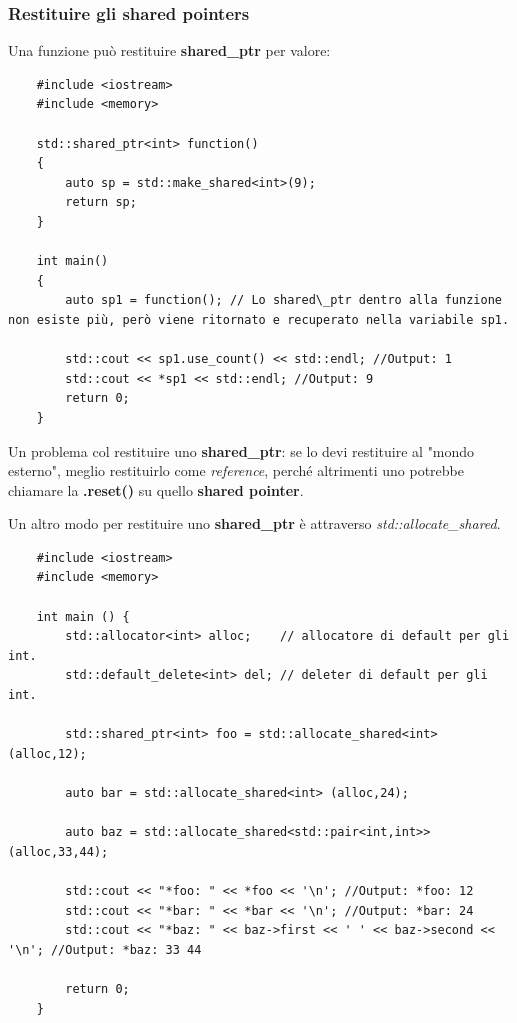 \subsubsection{Restituire gli shared pointers}

\textsf{\small Una funzione può restituire \textbf{shared\_ptr} per valore: } \\

\begin{lstlisting}
	#include <iostream>
	#include <memory>
	
	std::shared_ptr<int> function()
	{
		auto sp = std::make_shared<int>(9);
		return sp;
	}

	int main()
	{
		auto sp1 = function(); // Lo shared\_ptr dentro alla funzione non esiste più, però viene ritornato e recuperato nella variabile sp1.
		
		std::cout << sp1.use_count() << std::endl; //Output: 1
		std::cout << *sp1 << std::endl; //Output: 9
		return 0;
	}
\end{lstlisting}

\textsf{\small Un problema col restituire uno \textbf{shared\_ptr}: se lo devi restituire al "mondo esterno", meglio restituirlo come \emph{reference}, perché altrimenti uno potrebbe chiamare la \textbf{.reset()} su quello \textbf{shared pointer}.} \break %

\textsf{\small Un altro modo per restituire uno \textbf{shared\_ptr} è attraverso \emph{std::allocate\_shared}.} \\

\begin{lstlisting}
	#include <iostream>
	#include <memory>
	
	int main () {
		std::allocator<int> alloc;    // allocatore di default per gli int.
		std::default_delete<int> del; // deleter di default per gli int.
		
		std::shared_ptr<int> foo = std::allocate_shared<int> (alloc,12);
		
		auto bar = std::allocate_shared<int> (alloc,24);
		
		auto baz = std::allocate_shared<std::pair<int,int>> (alloc,33,44);
		
		std::cout << "*foo: " << *foo << '\n'; //Output: *foo: 12
		std::cout << "*bar: " << *bar << '\n'; //Output: *bar: 24
		std::cout << "*baz: " << baz->first << ' ' << baz->second << '\n'; //Output: *baz: 33 44
		
		return 0;
	}
\end{lstlisting}

